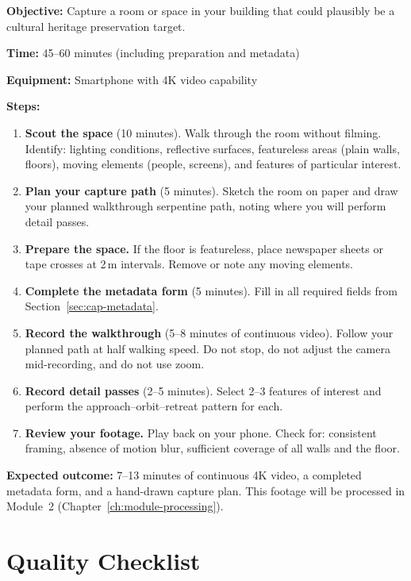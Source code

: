 \begin{tcolorbox}[
  enhanced,
  colback=SuccessGreen!8,
  colframe=SuccessGreen,
  fonttitle=\bfseries\sffamily,
  title={Exercise 1.1: Room Capture},
  sharp corners=south,
  boxrule=0.6pt
]
\textbf{Objective:} Capture a room or space in your building that could plausibly be a cultural heritage preservation target.

\textbf{Time:} 45--60 minutes (including preparation and metadata)

\textbf{Equipment:} Smartphone with 4K video capability

\textbf{Steps:}
\begin{enumerate}
  \item \textbf{Scout the space} (10 minutes). Walk through the room without filming. Identify: lighting conditions, reflective surfaces, featureless areas (plain walls, floors), moving elements (people, screens), and features of particular interest.
  \item \textbf{Plan your capture path} (5 minutes). Sketch the room on paper and draw your planned walkthrough serpentine path, noting where you will perform detail passes.
  \item \textbf{Prepare the space.} If the floor is featureless, place newspaper sheets or tape crosses at 2\,m intervals. Remove or note any moving elements.
  \item \textbf{Complete the metadata form} (5 minutes). Fill in all required fields from Section~\ref{sec:cap-metadata}.
  \item \textbf{Record the walkthrough} (5--8 minutes of continuous video). Follow your planned path at half walking speed. Do not stop, do not adjust the camera mid-recording, and do not use zoom.
  \item \textbf{Record detail passes} (2--5 minutes). Select 2--3 features of interest and perform the approach--orbit--retreat pattern for each.
  \item \textbf{Review your footage.} Play back on your phone. Check for: consistent framing, absence of motion blur, sufficient coverage of all walls and the floor.
\end{enumerate}

\textbf{Expected outcome:} 7--13 minutes of continuous 4K video, a completed metadata form, and a hand-drawn capture plan. This footage will be processed in Module~2 (Chapter~\ref{ch:module-processing}).
\end{tcolorbox}

\section{Quality Checklist}
\label{sec:cap-checklist}

